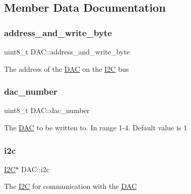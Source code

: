 \subsection{Member Data Documentation}
\hypertarget{class_d_a_c_a1dd1e9c4a63f493da44d7208e59cc83e}{}\label{class_d_a_c_a1dd1e9c4a63f493da44d7208e59cc83e} 
\subsubsection{\texorpdfstring{address\+\_\+and\+\_\+write\+\_\+byte}{address\_and\_write\_byte}}
{\footnotesize\ttfamily uint8\+\_\+t D\+A\+C\+::address\+\_\+and\+\_\+write\+\_\+byte\hspace{0.3cm}{\ttfamily [private]}}

The address of the \hyperlink{class_d_a_c}{D\+AC} on the \hyperlink{class_i2_c}{I2C} bus \hypertarget{class_d_a_c_afb39aacc3401c892403c477f857504f8}{}\label{class_d_a_c_afb39aacc3401c892403c477f857504f8} 
\subsubsection{\texorpdfstring{dac\+\_\+number}{dac\_number}}
{\footnotesize\ttfamily uint8\+\_\+t D\+A\+C\+::dac\+\_\+number\hspace{0.3cm}{\ttfamily [private]}}

The \hyperlink{class_d_a_c}{D\+AC} to be written to. In range 1-\/4. Default value is 1 \hypertarget{class_d_a_c_a70a9fd9603ee9fd9303628bd23338bf5}{}\label{class_d_a_c_a70a9fd9603ee9fd9303628bd23338bf5} 
\subsubsection{\texorpdfstring{i2c}{i2c}}
{\footnotesize\ttfamily \hyperlink{class_i2_c}{I2C}$\ast$ D\+A\+C\+::i2c\hspace{0.3cm}{\ttfamily [private]}}

The \hyperlink{class_i2_c}{I2C} for communication with the \hyperlink{class_d_a_c}{D\+AC} \hypertarget{class_d_a_c_a229a81d8ebf43511dfb6815c5cd8f425}{}\label{class_d_a_c_a229a81d8ebf43511dfb6815c5cd8f425} 
